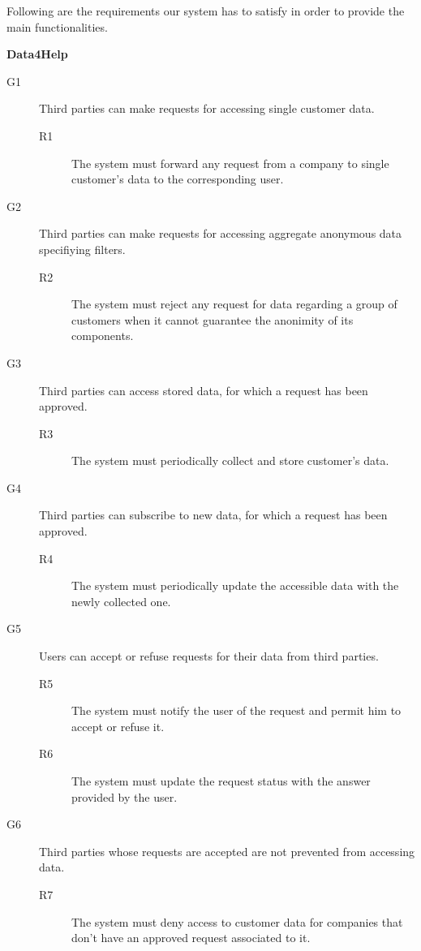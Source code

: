 \documentclass[../main.tex]{subfiles}
\begin{document}
Following are the requirements our system has to satisfy in order to provide the main functionalities.

\begin{minipage}{\textwidth}
{\bf Data4Help}
\begin{description}
	\item [G1]  Third parties can make requests for accessing single customer data.
	\begin{description}
		\item [R1] The system must forward any request from a company to single customer's data to the corresponding user.
	\end{description}

	\item [G2]  Third parties can make requests for accessing aggregate anonymous data specifiying filters.
	\begin{description}
		\item [R2] The system must reject any request for data regarding a group of customers when it cannot guarantee the anonimity of its components.
	\end{description}

	\item [G3]  Third parties can access stored data, for which a request has been approved.
	\begin{description}
		\item [R3] The system must periodically collect and store customer's data.
	\end{description}

	\item [G4]  Third parties can subscribe to new data, for which a request has been approved.
	\begin{description}
		\item [R4] The system must periodically update the accessible data with the newly collected one.
	\end{description}

	\item [G5]  Users can accept or refuse requests for their data from third parties.
	\begin{description}
		\item [R5] The system must notify the user of the request and permit him to accept or refuse it.
		\item [R6] The system must update the request status with the answer provided by the user.
	\end{description}

	\item [G6]  Third parties whose requests are accepted are not prevented from accessing data.
	\begin{description}
		\item [R7] The system must deny access to customer data for companies that don't have an approved request associated to it.
	\end{description}
\end{description}
\end{minipage}
\vspace{8mm}
\end{document}
